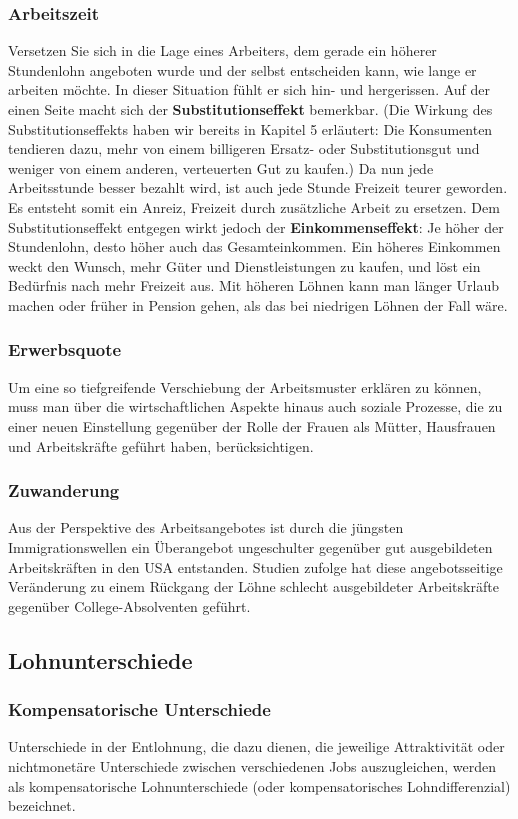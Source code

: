 \documentclass[10pt]{scrartcl}
\begin{document}
\subsubsection{Arbeitszeit}
Versetzen Sie sich in die Lage eines Arbeiters, dem gerade ein höherer Stundenlohn angeboten wurde und der selbst entscheiden kann, wie lange er arbeiten möchte. In dieser Situation fühlt er sich hin- und hergerissen. Auf der einen Seite macht sich der {\bf Substitutionseffekt}  bemerkbar. (Die Wirkung des Substitutionseffekts haben wir bereits in Kapitel 5 erläutert: Die Konsumenten tendieren dazu, mehr von einem billigeren Ersatz- oder Substitutionsgut und weniger von einem anderen, verteuerten Gut zu kaufen.) Da nun jede Arbeitsstunde besser bezahlt wird, ist auch jede Stunde Freizeit teurer geworden. Es entsteht somit ein Anreiz, Freizeit durch zusätzliche Arbeit zu ersetzen. Dem Substitutionseffekt entgegen wirkt jedoch der {\bf Einkommenseffekt}: Je höher der Stundenlohn, desto höher auch das Gesamteinkommen. Ein höheres Einkommen weckt den Wunsch, mehr Güter und Dienstleistungen zu kaufen, und löst ein Bedürfnis nach mehr Freizeit aus. Mit höheren Löhnen kann man länger Urlaub machen oder früher in Pension gehen, als das bei niedrigen Löhnen der Fall wäre.
\subsubsection{Erwerbsquote}
Um eine so tiefgreifende Verschiebung der Arbeitsmuster erklären zu können, muss man über die wirtschaftlichen Aspekte hinaus auch soziale Prozesse, die zu einer neuen Einstellung gegenüber der Rolle der Frauen als Mütter, Hausfrauen und Arbeitskräfte geführt haben, berücksichtigen.
\subsubsection{Zuwanderung}
Aus der Perspektive des Arbeitsangebotes ist durch die jüngsten Immigrationswellen ein Überangebot ungeschulter gegenüber gut ausgebildeten Arbeitskräften in den USA entstanden. Studien zufolge hat diese angebotsseitige Veränderung zu einem Rückgang der Löhne schlecht ausgebildeter Arbeitskräfte gegenüber College-Absolventen geführt.

\subsection{Lohnunterschiede}
\subsubsection{Kompensatorische Unterschiede}
Unterschiede in der Entlohnung, die dazu dienen, die jeweilige Attraktivität oder nichtmonetäre Unterschiede zwischen verschiedenen Jobs auszugleichen, werden als kompensatorische Lohnunterschiede (oder kompensatorisches Lohndifferenzial) bezeichnet. 
\end{document}
